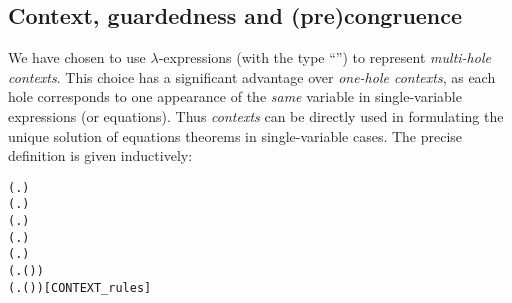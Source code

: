 
\subsection{Context, guardedness and (pre)congruence}


We have chosen to use $\lambda$-expressions (with the type
``'')
to represent \emph{multi-hole contexts}.
%
This choice has a significant advantage over \emph{one-hole
contexts}, as each hole corresponds to one
appearance of the \emph{same} variable in single-variable
expressions (or equations). Thus \emph{contexts} can be directly used in
formulating the unique solution of equations theorems in
single-variable cases. The precise definition is given inductively:
\begin{alltt}
 (\HOLTokenLambda{}. )
 (\HOLTokenLambda{}. )
  \HOLSymConst{\HOLTokenImp{}}  (\HOLTokenLambda{}.  )
  \HOLSymConst{\HOLTokenConj{}}   \HOLSymConst{\HOLTokenImp{}}  (\HOLTokenLambda{}.   \HOLSymConst{\ensuremath{+}}  )
  \HOLSymConst{\HOLTokenConj{}}   \HOLSymConst{\HOLTokenImp{}}  (\HOLTokenLambda{}.   \HOLSymConst{\ensuremath{\parallel}}  )
  \HOLSymConst{\HOLTokenImp{}}  (\HOLTokenLambda{}. \HOLSymConst{\ensuremath{\nu}}  ( ))
  \HOLSymConst{\HOLTokenImp{}}  (\HOLTokenLambda{}.  ( ) )\hfill{[CONTEXT_rules]}
\end{alltt}

